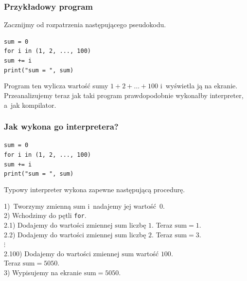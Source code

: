 \documentclass[10pt,t]{beamer}
\begin{document}
\begin{frame}
  \frametitle{Przykładowy program}


  Zacznijmy od rozpatrzenia następującego pseudokodu.

  \texttt{sum = 0} \\

  \texttt{for i in (1, 2, ..., 100)} \\
  \hphantom{aaaa} \texttt{sum += i} \\

  \texttt{print("sum = ", sum)}

  Program ten wylicza wartość sumy $1 + 2 + \ldots + 100$ i~wyświetla ją na
  ekranie. Przeanalizujemy teraz jak taki program prawdopodobnie wykonałby
  interpreter, a~jak kompilator.

\end{frame}





\begin{frame}
  \frametitle{Jak wykona go interpretera?}


  \texttt{sum = 0} \\

  \texttt{for i in (1, 2, ..., 100)} \\
  \hphantom{aaaa} \texttt{sum += i} \\

  \texttt{print("sum = ", sum)}

  Typowy interpreter wykona zapewne następującą procedurę.

  1)~Tworzymy zmienną \texttt{$\text{sum}$} i~nadajemy jej wartość~$0$. \\
  2) Wchodzimy do pętli \texttt{for}. \\
  2.1) Dodajemy do wartości zmiennej \texttt{$\text{sum}$} liczbę $1$. Teraz
  \texttt{$\text{sum} = 1$}. \\
  2.2) Dodajemy do wartości zmiennej \texttt{$\text{sum}$} liczbę $2$.
  Teraz \texttt{$\text{sum} = 3$}. \\
  \hphantom{aaa} $\vdots$ \\
  2.100) Dodajemy do wartości zmiennej \texttt{$\text{sum}$} wartość
  $100$. \\
  Teraz \texttt{$\text{sum} = 5050$}. \\
  3) Wypisujemy na ekranie \texttt{$\text{sum} = 5050$}.

\end{frame}
\end{document}
